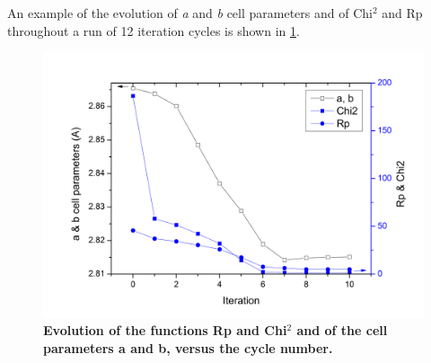 An example of the evolution of \textit{a} and \textit{b} cell parameters and of Chi$^{2}$ and Rp throughout a run of 12 iteration cycles is shown in \ref{cycles}.

\begin{figure}[!htbp]
\begin{center}
\includegraphics [width=4 in]{chi2_Rf.jpg}
\caption{\bf Evolution of the functions Rp and Chi$^{2}$ and of the cell parameters a and b, versus the cycle number. }
\label{cycles}
\end{center}
\end{figure}
